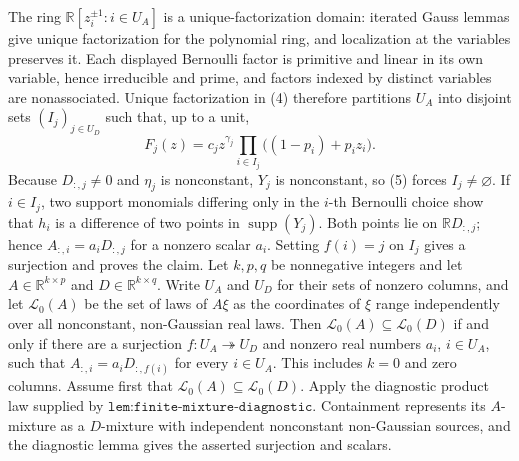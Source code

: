 The ring \(\mathbb R[z_i^{\pm1}:i\in U_A]\) is a unique-factorization domain: iterated Gauss lemmas give unique factorization for the polynomial ring, and localization at the variables preserves it. Each displayed Bernoulli factor is primitive and linear in its own variable, hence irreducible and prime, and factors indexed by distinct variables are nonassociated. Unique factorization in (4) therefore partitions \(U_A\) into disjoint sets \((I_j)_{j\in U_D}\) such that, up to a unit,
\[
F_j(z)=c_jz^{\gamma_j}\prod_{i\in I_j}\bigl((1-p_i)+p_i z_i\bigr). \tag{5}
\]
Because \(D_{:,j}\ne0\) and \(\eta_j\) is nonconstant, \(Y_j\) is nonconstant, so (5) forces \(I_j\ne\varnothing\). If \(i\in I_j\), two support monomials differing only in the \(i\)-th Bernoulli choice show that \(h_i\) is a difference of two points in \(\operatorname{supp}(Y_j)\). Both points lie on \(\mathbb RD_{:,j}\); hence \(A_{:,i}=a_iD_{:,j}\) for a nonzero scalar \(a_i\). Setting \(f(i)=j\) on \(I_j\) gives a surjection and proves the claim.
Let \(k,p,q\) be nonnegative integers and let \(A\in\mathbb R^{k\times p}\) and \(D\in\mathbb R^{k\times q}\). Write \(U_A\) and \(U_D\) for their sets of nonzero columns, and let \(\mathscr L_0(A)\) be the set of laws of \(A\xi\) as the coordinates of \(\xi\) range independently over all nonconstant, non-Gaussian real laws. Then \(\mathscr L_0(A)\subseteq\mathscr L_0(D)\) if and only if there are a surjection \(f:U_A\twoheadrightarrow U_D\) and nonzero real numbers \(a_i\), \(i\in U_A\), such that \(A_{:,i}=a_iD_{:,f(i)}\) for every \(i\in U_A\). This includes \(k=0\) and zero columns.
Assume first that \(\mathscr L_0(A)\subseteq\mathscr L_0(D)\). Apply the diagnostic product law supplied by \(\texttt{lem:finite-mixture-diagnostic}\). Containment represents its \(A\)-mixture as a \(D\)-mixture with independent nonconstant non-Gaussian sources, and the diagnostic lemma gives the asserted surjection and scalars.

